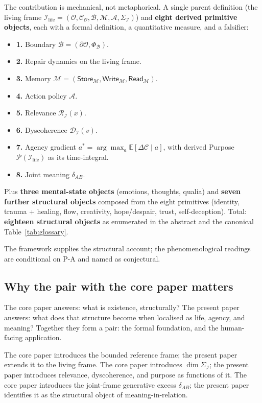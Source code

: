 \documentclass[11pt]{article}
\theoremstyle{plain}
\theoremstyle{definition}
\theoremstyle{remark}
\newcommand{\Ical}{\mathcal{I}}
\newcommand{\Ocal}{\mathcal{O}}
\newcommand{\Ccal}{\mathcal{C}}
\newcommand{\Mcal}{\mathcal{M}}
\newcommand{\Acal}{\mathcal{A}}
\newcommand{\Bcal}{\mathcal{B}}
\newcommand{\Rcal}{\mathcal{R}}
\newcommand{\Dcal}{\mathcal{D}}
\newcommand{\Pcal}{\mathcal{P}}
\newcommand{\Ilife}{\Ical_{\mathrm{life}}}
\begin{document}
The contribution is mechanical, not metaphorical. A single parent definition (the living frame $\Ilife = (\Ocal, \Ccal_\Ocal, \Bcal, \Mcal, \Acal, \Sigma_\Ical)$) and \textbf{eight derived primitive objects}, each with a formal definition, a quantitative measure, and a falsifier:

\begin{itemize}[leftmargin=2em]
\item \textbf{1.} Boundary $\Bcal = (\partial \Ocal, \Phi_\Bcal)$.
\item \textbf{2.} Repair dynamics on the living frame.
\item \textbf{3.} Memory $\Mcal = (\mathsf{Store}_\Mcal, \mathsf{Write}_\Mcal, \mathsf{Read}_\Mcal)$.
\item \textbf{4.} Action policy $\Acal$.
\item \textbf{5.} Relevance $\Rcal_\Ical(x)$.
\item \textbf{6.} Dyscoherence $\Dcal_\Ical(v)$.
\item \textbf{7.} Agency gradient $a^* = \arg\max_a \mathbb{E}[\Delta \Ccal \mid a]$, with derived Purpose $\Pcal(\Ilife)$ as its time-integral.
\item \textbf{8.} Joint meaning $\delta_{AB}$.
\end{itemize}

Plus \textbf{three mental-state objects} (emotions, thoughts, qualia) and \textbf{seven further structural objects} composed from the eight primitives (identity, trauma + healing, flow, creativity, hope/despair, trust, self-deception). Total: \textbf{eighteen structural objects} as enumerated in the abstract and the canonical Table~\ref{tab:glossary}.

The framework supplies the structural account; the phenomenological readings are conditional on P-A and named as conjectural.

\subsection{Why the pair with the core paper matters}

The core paper answers: what is existence, structurally? The present paper answers: what does that structure become when localised as life, agency, and meaning? Together they form a pair: the formal foundation, and the human-facing application.

The core paper introduces the bounded reference frame; the present paper extends it to the living frame. The core paper introduces $\dim \Sigma_\Ical$; the present paper introduces relevance, dyscoherence, and purpose as functions of it. The core paper introduces the joint-frame generative excess $\delta_{AB}$; the present paper identifies it as the structural object of meaning-in-relation.
\end{document}
